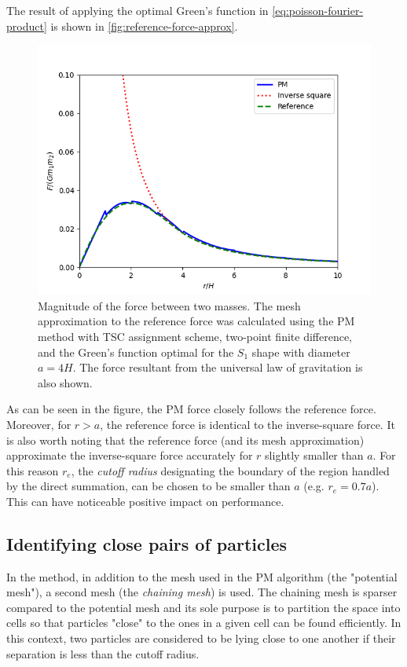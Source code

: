 The result of applying the optimal Green's function in \autoref{eq:poisson-fourier-product} is shown in \autoref{fig:reference-force-approx}.
\begin{figure}[htp]
    \centering
    \includegraphics[scale=0.6]{img/optimal-green-force-4.png}
    \caption{Magnitude of the force between two masses.
        The mesh approximation to the reference force was calculated using the PM method with TSC assignment scheme, two-point finite difference, and the Green's function optimal for the $S_1$ shape with diameter $a=4H$.
        The force resultant from the universal law of gravitation is also shown.}
    \label{fig:reference-force-approx}
\end{figure}
As can be seen in the figure, the PM force closely follows the reference force.
Moreover, for $r>a$, the reference force is identical to the inverse-square force.
It is also worth noting that the reference force (and its mesh approximation) approximate the inverse-square force accurately for $r$ slightly smaller than $a$.
For this reason $r_e$, the \textit{cutoff radius} designating the boundary of the region handled by the direct summation, can be chosen to be smaller than $a$ (e.g. $r_e = 0.7a$).
This can have noticeable positive impact on performance.

\subsection{Identifying close pairs of particles}
In the \PThreeM{} method, in addition to the mesh used in the PM algorithm (the "potential mesh"), a second mesh (the \textit{chaining mesh}) is used.
The chaining mesh is sparser compared to the potential mesh and its sole purpose is to partition the space into cells so that particles "close" to the ones in a given cell can be found efficiently.
In this context, two particles are considered to be lying close to one another if their separation is less than the cutoff radius.

